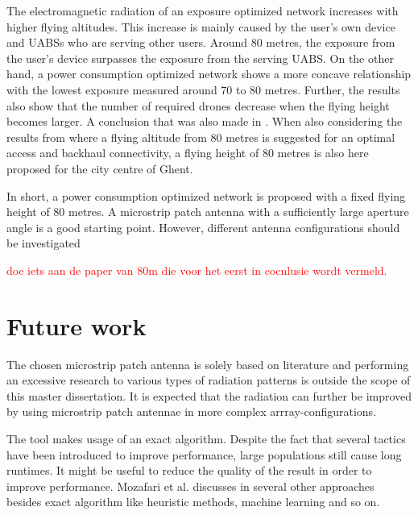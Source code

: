The electromagnetic radiation of an exposure optimized network increases with higher flying altitudes. This increase is mainly caused by the user's 
own device and \gls{UABS}s who are serving other users. Around 80 metres, the exposure from the  user's device surpasses the exposure from the serving \gls{UABS}.
On the other hand, a power consumption optimized network shows a more concave relationship with the lowest exposure measured around 70 to 80 metres.
Further, the results also show that the number of required drones decrease when the flying height becomes larger. A conclusion that was also made in \cite{J2}.
 When also considering the results from \cite{U1} where a flying altitude from 
80 metres is suggested for an optimal access and backhaul connectivity, a flying height 
of 80 metres is also here proposed for the city centre of Ghent.

In short, a power consumption optimized network is proposed with a fixed flying height of 80 metres. A microstrip patch 
antenna with a sufficiently large aperture angle is a good starting point. However, different antenna configurations should 
be investigated 

\textcolor{red}{doe iets aan de paper van 80m die voor het eerst in cocnlusie wordt vermeld.}

\section{Future work}

The chosen microstrip patch antenna is solely based on literature and performing an excessive research to various 
types of radiation patterns is outside the scope of this master dissertation. It is expected that the radiation can 
further be improved by using microstrip patch antennae in more complex arrray-configurations.

The tool makes usage of an \gls{exact algorithm}. Despite the fact that several  
tactics have been introduced to improve performance, large populations still cause long runtimes. It might be useful 
to reduce the quality of the result in order to improve performance. Mozafari et al. discusses in \cite{U3} several 
other approaches besides \gls{exact algorithm} like heuristic methods, machine learning and so on.